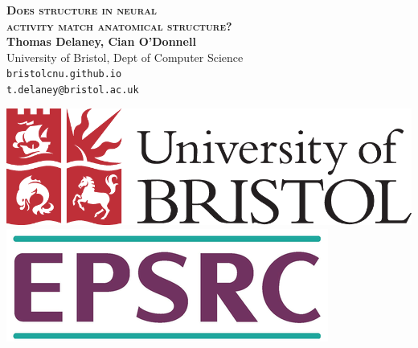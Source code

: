 \documentclass[a0,portrait]{a0poster}
\begin{document}

\begin{minipage}[b]{0.75\linewidth}
  \veryHuge \color{NavyBlue} \textbf{\textsc{Does structure in neural \\[0.3cm] activity match anatomical structure?}} \color{Black}\\[1cm] %
  \huge \textbf{Thomas Delaney, Cian O'Donnell}\\[0.3cm] %
  \huge University of Bristol, Dept of Computer Science\\[0.1cm] %
  \large \texttt{bristolcnu.github.io} \\
  \Large \texttt{t.delaney@bristol.ac.uk} \\
\end{minipage}
%
\begin{minipage}[b]{0.24\linewidth}
  \centering
  \includegraphics[width=0.9\linewidth]{bristol_university_logo.png} \vspace{0.3cm}\\
  \includegraphics[width=0.9\linewidth]{epsrc_logo.png} \vspace{2.7cm}\\
\end{minipage}
\end{document}

